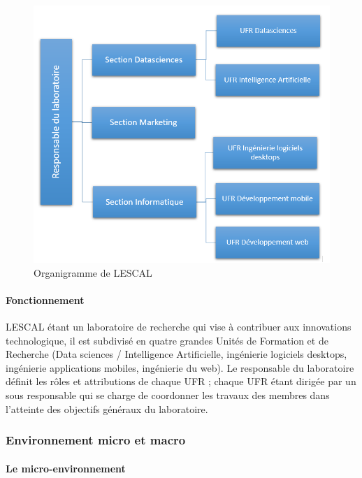 \begin{figure}
\centering
\includegraphics{img/orga.png}
\caption{Organigramme de LESCAL}
\end{figure}

\paragraph{Fonctionnement}\label{fonctionnement}

LESCAL étant un laboratoire de recherche qui vise à contribuer aux
innovations technologique, il est subdivisé en quatre grandes Unités de
Formation et de Recherche (Data sciences / Intelligence Artificielle,
ingénierie logiciels desktops, ingénierie applications mobiles,
ingénierie du web). Le responsable du laboratoire définit les rôles et
attributions de chaque UFR ; chaque UFR étant dirigée par un sous
responsable qui se charge de coordonner les travaux des membres dans
l'atteinte des objectifs généraux du laboratoire.

\subsubsection{Environnement micro et
macro}\label{environnement-micro-et-macro}

\paragraph{Le micro-environnement}\label{le-micro-environnement}

